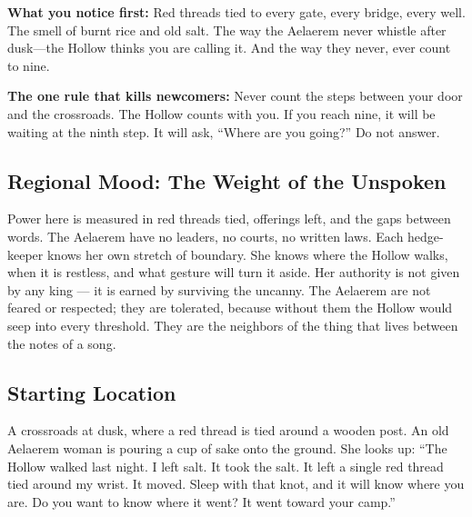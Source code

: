 \vspace{1em}

\begin{tcolorbox}[colback=black!3,colframe=blue!60!black,title={Theme \& Atmosphere},breakable]
\textbf{What you notice first:} Red threads tied to every gate, every bridge, every well. The smell of burnt rice and old salt. The way the Aelaerem never whistle after dusk---the Hollow thinks you are calling it. And the way they never, ever count to nine.

\textbf{The one rule that kills newcomers:} Never count the steps between your door and the crossroads. The Hollow counts with you. If you reach nine, it will be waiting at the ninth step. It will ask, ``Where are you going?'' Do not answer.
\end{tcolorbox}

\subsection*{Regional Mood: The Weight of the Unspoken}

Power here is measured in red threads tied, offerings left, and the gaps between words. The Aelaerem have no leaders, no courts, no written laws. Each hedge-keeper knows her own stretch of boundary. She knows where the Hollow walks, when it is restless, and what gesture will turn it aside. Her authority is not given by any king --- it is earned by surviving the uncanny. The Aelaerem are not feared or respected; they are tolerated, because without them the Hollow would seep into every threshold. They are the neighbors of the thing that lives between the notes of a song.

\subsection*{Starting Location}

A crossroads at dusk, where a red thread is tied around a wooden post. An old Aelaerem woman is pouring a cup of sake onto the ground. She looks up: ``The Hollow walked last night. I left salt. It took the salt. It left a single red thread tied around my wrist. It moved. Sleep with that knot, and it will know where you are. Do you want to know where it went? It went toward your camp.''


